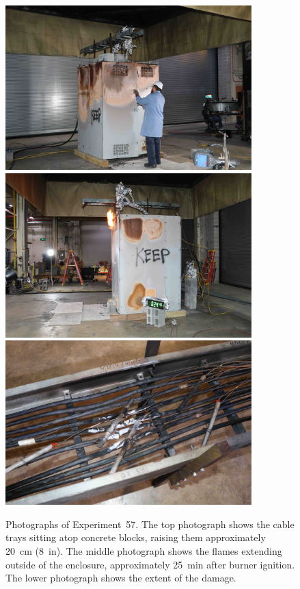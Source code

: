 \begin{figure}[p]
\centering
\includegraphics[height=2.50in]{../FIGURES/Test_57_setup} \\  \vspace{0.1in}
\includegraphics[height=2.50in]{../FIGURES/Test_57_24_min_46_s} \\  \vspace{0.1in}
\includegraphics[height=2.50in]{../FIGURES/Test_57_scar}
\caption[Photographs of Experiment~57]{Photographs of Experiment~57. The top photograph shows the cable trays sitting atop concrete blocks, raising them approximately 20~cm (8~in). The middle photograph shows the flames extending outside of the enclosure, approximately 25~min after burner ignition. The lower photograph shows the extent of the damage.}
\label{fig:Test_57_photos}
\end{figure}


